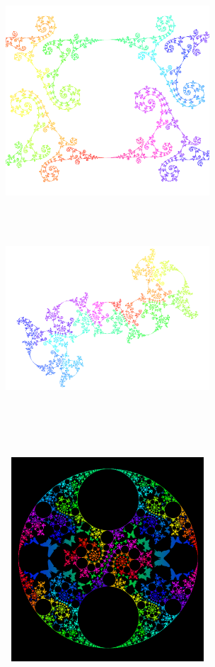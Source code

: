 \begin{figure}[htbp]
 \begin{subfigure}{0.49\hsize}
  \begin{center}
   \includegraphics[width=3in, height=3in, keepaspectratio]{../img/klein/horizon.pdf}
   \caption{}
   \label{fig:horizon1}
  \end{center}
 \end{subfigure}
 \begin{subfigure}{0.49\hsize}
  \begin{center}
   \includegraphics[width=3in, height=3in, keepaspectratio]{../img/klein/limit-horizontal.pdf}
   \caption{}
   \label{fig:horizon2}
  \end{center}
 \end{subfigure}\\
 \begin{subfigure}{0.49\hsize}
  \begin{center}
   \includegraphics[width=3in, height=3in, keepaspectratio]{../img/klein/limit3.pdf}

\end{center}
\end{subfigure}
\end{figure}
